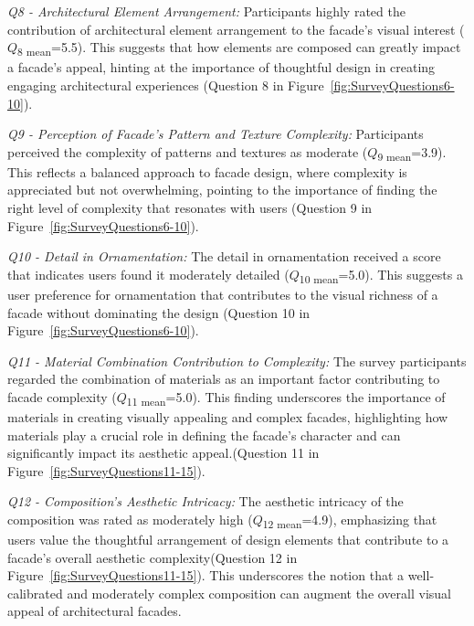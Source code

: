\textit{Q8 - Architectural Element Arrangement:}
Participants highly rated the contribution of architectural element arrangement to the facade's visual interest  (\(Q\)\textsubscript{\small{8 mean}}=5.5).
This suggests that how elements are composed can greatly impact a facade's appeal, hinting at the importance of thoughtful design in creating engaging architectural experiences (Question 8 in Figure~\ref{fig:SurveyQuestions6-10}).

\textit{Q9 - Perception of Facade's Pattern and Texture Complexity:}
Participants perceived the complexity of patterns and textures as moderate  (\(Q\)\textsubscript{\small{9 mean}}=3.9).
This reflects a balanced approach to facade design, where complexity is appreciated but not overwhelming, pointing to the importance of finding the right level of complexity that resonates with users (Question 9 in Figure~\ref{fig:SurveyQuestions6-10}).

\textit{Q10 - Detail in Ornamentation:}
The detail in ornamentation received a score that indicates users found it moderately detailed  (\(Q\)\textsubscript{\small{10 mean}}=5.0).
This suggests a user preference for ornamentation that contributes to the visual richness of a facade without dominating the design (Question 10 in Figure~\ref{fig:SurveyQuestions6-10}).

\textit{Q11 - Material Combination Contribution to Complexity:}
The survey participants regarded the combination of materials as an important factor contributing to facade complexity (\(Q\)\textsubscript{\small{11 mean}}=5.0).
This finding underscores the importance of materials in creating visually appealing and complex facades, highlighting how materials play a crucial role in defining the facade's character and can significantly impact its aesthetic appeal.(Question 11 in Figure~\ref{fig:SurveyQuestions11-15}).

\textit{Q12 - Composition's Aesthetic Intricacy:}
The aesthetic intricacy of the composition was rated as moderately high (\(Q\)\textsubscript{\small{12 mean}}=4.9), emphasizing that users value the thoughtful arrangement of design elements that contribute to a facade's overall aesthetic complexity(Question 12 in Figure~\ref{fig:SurveyQuestions11-15}). This underscores the notion that a well-calibrated and moderately complex composition can augment the overall visual appeal of architectural facades.


